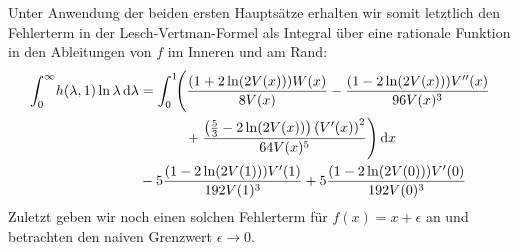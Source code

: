 Unter Anwendung der beiden ersten Hauptsätze erhalten wir somit letztlich den
Fehlerterm in der Lesch-Vertman-Formel als Integral über eine rationale Funktion
in den Ableitungen von $f$ im Inneren und am Rand:
\begin{align*}
  \Integ[\infty]{0}{\lambda}{
    h(\lambda, 1) \ln\lambda
  }
  &=
  \Int{x}{\Biggl(\frac{(1 + 2 \ln(2 V(x))) W(x)}{8 V(x)}
    - \frac{ (1 - 2 \ln(2 V(x)))V''(x)}{96 V(x)^{3}} \\
    &\hphantom{=\int_0^1\Biggl(}\mathbin{+} \frac{\left(\frac{5}{3} - 2\ln(2
    V(x))\right)\left(V'(x)\right)^{2}}{64 V(x)^{5}}\Biggr) } \\
&\mathbin- 5\frac{(1 - 2\ln(2 V(1)))V'(1)}{192 V(1)^3}
+ 5\frac{(1 - 2 \ln(2 V(0)))V'(0)}{192 V(0)^3}
\end{align*}
Zuletzt geben wir noch einen solchen Fehlerterm für $f(x) = x + \epsilon$ an und
betrachten den naiven Grenzwert $\epsilon \to 0$.
